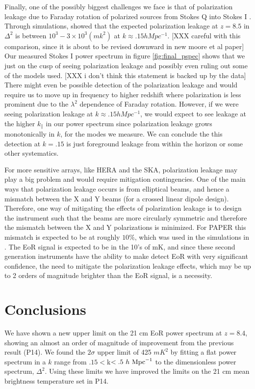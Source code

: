 \documentclass[twocolumn,numberedappendix]{emulateapj} \shorttitle{PSA64}
\begin{document}
Finally, one of the possibly biggest challenges we face is that of polarization
leakage due to Faraday rotation of polarized sources from Stokes Q into Stokes
I \citep{jelic_et_al2010,jelic_et_al2014}. 
Through simulations, \cite{moore_et_al2013} showed that the expected
polarization leakage at $z=8.5$ in $\Delta^{2}$ is between
$10^{3}-3\times10^{3} (mk^{2})$ at $k\approx{.15}hMpc^{-1}$. 
[XXX careful with this comparison, since it is about to be revised downward in new moore et al paper]
Our measured Stokes
I power spectrum in figure \ref{fig:final_pspec} shows that we just on the cusp
of seeing polarization leakage and possibly even ruling out some of the models
used. [XXX i don't think this statement is backed up by the data]
There might even be possible detection of the polarization leakage and
would require us to move up in frequency to higher redshift where polarization
is less prominent due to the $\lambda^{2}$ dependence of Faraday rotation.
However, if we were seeing polarization leakage at $k\approx{.15}hMpc^{-1}$, we
would expect to see leakage at the higher $k_{\parallel}$ in our power spectrum
since polarization leakage grows monotonically in $k$, for the modes we measure.
We can conclude the this detection at $k=.15$ is just foreground leakage from
within the horizon or some other systematics.

For more sensitive arrays, like HERA and the SKA, polarization leakage may play
a big problem and would require mitigation contingencies. One of the main ways
that polarization leakage occurs is from elliptical beams, and hence a mismatch
between the X and Y beams (for a crossed linear dipole design). Therefore, one
way of mitigating the effects of polarization leakage is to design the
instrument such that the beams are more circularly symmetric and therefore the
mismatch between the X and Y polarizations is minimized. For PAPER this mismatch
is expected to be at roughly $10\%$, which was used in the simulations in
\cite{moore_et_al2013}.  The EoR signal is expected to be in the 10's of mK, and
since these second generation instruments have the ability to make detect EoR
with very significant confidence, the need to mitigate the polarization leakage
effects, which may be up to 2 orders of magnitude brighter than the EoR signal,
is a necessity.




\section{Conclusions}\label{sec:conclusion}
We have shown a new upper limit on the 21 cm EoR power spectrum at $z=8.4$,
showing an almost an order of magnitude of improvement from the previous result (P14).
We found the $2\sigma$ upper limit of 425 $mK^{2}$ by fitting a
flat power spectrum in a $k$ range from $.15<$k$<.5\ h\ {\rm Mpc}^{-1}$ to the
dimensionless power spectrum, $\Delta^{2}$. Using these limits we have improved
the limits on the 21 cm mean brightness temperature set in P14.
\end{document}
